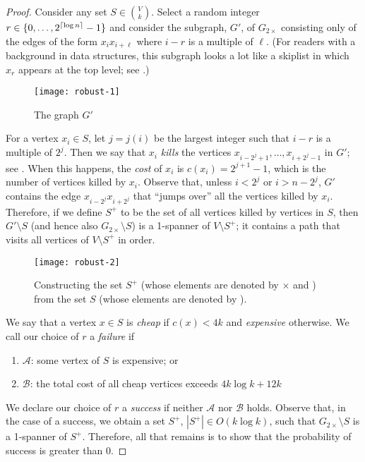 \documentclass{patmorin}
\begin{document}
\begin{proof}
  Consider any set $S\in\binom{V}{k}$.  Select a random integer
  $r\in\{0,\ldots,2^{{\lceil \log n \rceil}}-1\}$ and consider the subgraph,
  $G'$, of $G_{2\times}$ consisting only of the edges of the form
  $x_ix_{i+\ell}$ where $i-r$ is a multiple of $\ell$.  (For readers
  with a background in data structures, this subgraph looks a lot like a
  skiplist in which $x_r$ appears at the top level; see .)

  \begin{figure}
    \begin{center}
      \texttt{[image: robust-1]}
    \end{center}
    \caption{The graph $G'$}
  \end{figure}

  For a vertex $x_i\in S$, let $j=j(i)$ be the largest integer such that
  $i-r$ is a multiple of $2^j$.  Then we say that $x_i$ \emph{kills}
  the vertices $x_{i-2^{j}+1},\ldots,x_{i+2^{j}-1}$ in $G'$; see
  .  When this happens, the \emph{cost} of $x_i$ is
  $c(x_i)=2^{j+1}-1$, which is the number of vertices killed by $x_i$.
  Observe that, unless $i<2^{j}$ or $i>n-2^{j}$, $G'$ contains the
  edge $x_{i-2^{j}}x_{i+2^{j}}$ that ``jumps over'' all the vertices
  killed by $x_i$.  Therefore, if we define $S^+$ to be the set of all
  vertices killed by vertices in $S$, then $G'\setminus S$ (and hence
  also $G_{2\times}\setminus S$) is a 1-spanner of $V\setminus S^+$; it
  contains a path that visits all vertices of $V\setminus S^+$ in order.
  
  \begin{figure}
    \begin{center}
      \texttt{[image: robust-2]}
    \end{center}
    \caption{Constructing the set $S^+$ (whose elements are denoted
    by $\times$ and \textbullet)
      from the set $S$ (whose elements are denoted by \textbullet).}
  \end{figure}
  
  We say that a vertex $x\in S$ is \emph{cheap} if $c(x) < 4k$ and
  \emph{expensive} otherwise.  We call our choice of $r$ a \emph{failure}
  if
  \begin{enumerate}
    \item $\mathcal{A}$: some vertex of $S$ is expensive; or
    \item $\mathcal{B}$: the total cost of all cheap vertices exceeds
      $4k\log k+12k$
  \end{enumerate}
  We declare our choice of $r$ a \emph{success} if neither $\mathcal{A}$
  nor $\mathcal{B}$ holds.  Observe that, in the case of a success, we
  obtain a set $S^+$, $|S^+|\in O(k\log k)$, such that $G_{2\times}\setminus
  S$ is a 1-spanner of $S^+$.  Therefore, all that remains is to show that the
  probability of success is greater than 0.
  

\end{proof}
\end{document}

